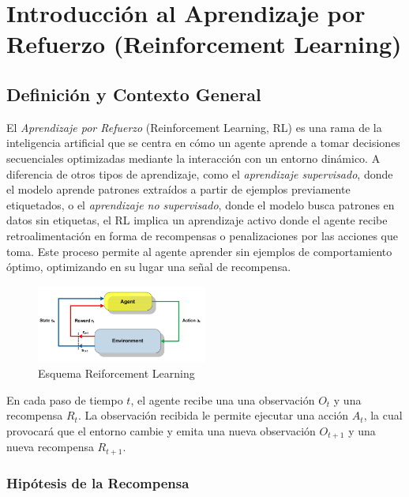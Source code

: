 \documentclass[a4paper,12pt]{report}
\begin{document}
\section{Introducción al Aprendizaje por Refuerzo (Reinforcement Learning)}

\subsection{Definición y Contexto General}

El \textit{Aprendizaje por Refuerzo} (Reinforcement Learning, RL) es una rama de la inteligencia 
artificial que se centra en cómo un agente aprende a tomar decisiones secuenciales optimizadas 
mediante la interacción con un entorno dinámico. A diferencia de otros tipos de aprendizaje, como 
el \textit{aprendizaje supervisado}, donde el modelo aprende patrones extraídos a partir de ejemplos 
previamente etiquetados, o el \textit{aprendizaje no supervisado}, donde el modelo busca patrones 
en datos sin etiquetas, el RL implica un aprendizaje activo donde el agente recibe retroalimentación 
en forma de recompensas o penalizaciones por las acciones que toma. Este proceso permite al 
agente aprender sin ejemplos de comportamiento óptimo, optimizando en su lugar una señal de recompensa.

\begin{figure}[H]
    \centering
    \includegraphics[width=0.5\textwidth]{./figures/A-brief-schema-of-Reinforcement-Learning-26.png}
    \caption{Esquema Reiforcement Learning}
    \label{fig:RF-schema}
\end{figure}

En cada paso de tiempo \(t\), el agente recibe una una observación \(O_t\) y una recompensa \(R_t\).
La observación recibida le permite ejecutar una acción \(A_t\), la cual provocará que el entorno cambie
y emita una nueva observación \(O_{t+1}\) y una nueva recompensa \(R_{t+1}\).

\subsubsection{Hipótesis de la Recompensa}
\end{document}

